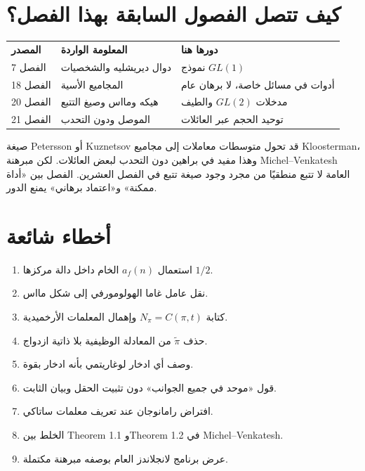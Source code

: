 \section{كيف تتصل الفصول السابقة بهذا الفصل؟}

\begin{center}
\begin{tabular}{lll}
\textbf{المصدر} & \textbf{المعلومة الواردة} & \textbf{دورها هنا}\\
الفصل 7 & دوال ديريشليه والشخصيات & نموذج \(GL(1)\)\\
الفصل 18 & المجاميع الأسية & أدوات في مسائل خاصة، لا برهان عام\\
الفصل 20 & هيكه ومااس وصيغ التتبع & مدخلات \(GL(2)\) والطيف\\
الفصل 21 & الموصل ودون التحدب & توحيد الحجم عبر العائلات
\end{tabular}
\end{center}

صيغة Petersson أو Kuznetsov قد تحول متوسطات معاملات إلى مجاميع
Kloosterman، وهذا مفيد في براهين دون التحدب لبعض العائلات. لكن مبرهنة
Michel--Venkatesh العامة لا تتبع منطقيًا من مجرد وجود صيغة تتبع في
الفصل العشرين. الفصل بين «أداة ممكنة» و«اعتماد برهاني» يمنع الدور.

\section{أخطاء شائعة}

\begin{enumerate}
  \item استعمال \(a_f(n)\) الخام داخل دالة مركزها \(1/2\).
  \item نقل عامل غاما الهولومورفي إلى شكل مااس.
  \item كتابة \(N_\pi=C(\pi,t)\) وإهمال المعلمات الأرخميدية.
  \item حذف \(\widetilde\pi\) من المعادلة الوظيفية بلا ذاتية ازدواج.
  \item وصف أي ادخار لوغاريتمي بأنه ادخار بقوة.
  \item قول «موحد في جميع الجوانب» دون تثبيت الحقل وبيان الثابت.
  \item افتراض رامانوجان عند تعريف معلمات ساتاكي.
  \item الخلط بين Theorem 1.1 وTheorem 1.2 في Michel--Venkatesh.
  \item عرض برنامج لانجلاندز العام بوصفه مبرهنة مكتملة.
\end{enumerate}

